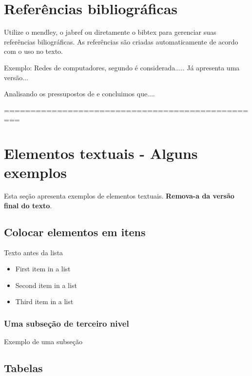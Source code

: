 \documentclass[	DIV=calc,%
							paper=a4,%
							fontsize=12pt,%
							onecolumn]{scrartcl}	 					%
\begin{document}
\section{Referências bibliográficas}
Utilize o mendley, o jabref ou diretamente o bibtex para gerenciar suas referências biliográficas. As referências são criadas automaticamente de acordo com o uso no texto.

Exemplo: Redes de computadores, segundo \cite{t2013} é considerada..... Já \cite{kurose2010} apresenta uma versão...

Analisando os pressupostos de \cite{ref3} e \cite{ref4} concluimos que....


\renewcommand\refname{} %

  

=================================================
\section{Elementos textuais - Alguns exemplos}

Esta seção apresenta exemplos de elementos textuais. \textbf{Remova-a da versão final do texto}.


\subsection{Colocar elementos em itens}

Texto antes da lista

\begin{itemize}
	\item First item in a list 
	\item Second item in a list 
	\item Third item in a list
\end{itemize}

\subsubsection{Uma subseção de terceiro nivel}

Exemplo de uma subseção

\subsection{Tabelas}
\end{document}
